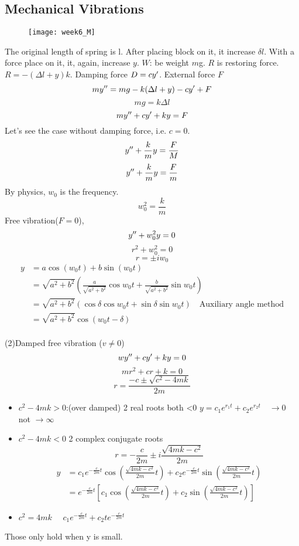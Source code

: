 \subsection{Mechanical Vibrations}
\begin{figure}[H]
\centering
\texttt{[image: week6\_M]}
\end{figure}
The original length of spring is l. After placing block on it, it increase $\delta l$. With a force place on it, it, again, increase $y$.  $W$: be weight $m$g. $R$ is restoring force. $R=-(\Delta l+y)k$. Damping force $D=cy^{\prime}$. External force $F$
\[my^{\prime\prime}=mg-k(\Delta l+y)-cy^{\prime}+F
\]
\[mg=k\Delta l
\]
\[my^{\prime\prime}+cy^{\prime}+ky=F
\]
Let's see the case without damping force, i.e. $c=0$.
\[y^{\prime\prime}+\frac{k}{m}y=\frac{F}{M}
\]
\[y^{\prime\prime}+\frac{k}{m}y=\frac{F}{m}
\]
By physics, $w_0$ is the frequency.
\[w_0^2=\frac{k}{m}
\]
Free vibration($F=0$),
\[y^{\prime\prime}+w_0^2y=0
\]
\[r^2+w_0^2=0
\]
\[r=\pm iw_0
\]
\[\begin{aligned}y&=a\cos(w_0t)+b\sin(w_0t)\\
&=\sqrt{a^2+b^2}(\frac{a}{\sqrt{a^2+b^2}}\cos w_0t+\frac{b}{\sqrt{a^2+b^2}}\sin w_0t)\\
&=\sqrt{a^2+b^2}(\cos\delta\cos w_0t+\sin\delta\sin w_0t)\quad\text{Auxiliary angle method}\\
&=\sqrt{a^2+b^2}\cos(w_0t-\delta)
\end{aligned}
\]
\\
(2)Damped free vibration ($v\neq0$)
\[wy^{\prime\prime}+cy^{\prime}+ky=0
\]
\[mr^2+cr+k=0
\]
\[r=\frac{-c\pm\sqrt{c^2-4mk}}{2m}
\]



\begin{itemize}
\item
$c^2-4mk>0$:(over damped) 2 real roots both <0 $y=c_1e^{r_1t}+c_2e^{r_2t}\quad\rightarrow0$ not $\rightarrow\infty$
\item
$c^2-4mk<0$ 2 complex conjugate roots
\[r=-\frac{c}{2m}\pm i\frac{\sqrt{4mk-c^2}}{2m}
\]
\[\begin{aligned}y&=c_1e^{-\frac{c}{2m}t}\cos(\frac{\sqrt{4mk-c^2}}{2m}t)+c_2e^{-\frac{c}{2m}t}\sin(\frac{\sqrt{4mk-c^2}}{2m}t)\\
&=e^{-\frac{c}{2m}t}[c_1\cos(\frac{\sqrt{4mk-c^2}}{2m}t)+c_2\sin(\frac{\sqrt{4mk-c^2}}{2m}t)]\end{aligned}
\]
\item
$c^2=4mk\quad$ $c_1e^{-\frac{c}{2m}t}+c_2te^{-\frac{c}{2m}t}$
\end{itemize}
\begin{remark}
Those only hold when y is small.


\end{remark}







